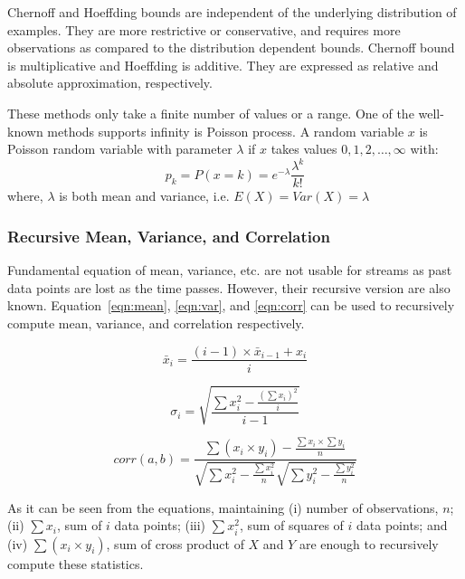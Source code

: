 \documentclass[a4paper, 11pt, oneside]{book}
\begin{document}
Chernoff and Hoeffding bounds are independent of the underlying distribution of examples. They are more restrictive or conservative, and requires more observations as compared to the distribution dependent bounds. Chernoff bound is multiplicative and Hoeffding is additive. They are expressed as relative and absolute approximation, respectively.

These methods only take a finite number of values or a range. One of the well-known methods supports infinity is Poisson process. A random variable $x$ is Poisson random variable with parameter $\lambda$ if $x$ takes values $0,1,2, \dots, \infty$ with:
    \begin{equation}
    \label{eqn:poisson}
        p_k = P(x=k) = e^{-\lambda} \frac{\lambda^k}{k!}
    \end{equation}
    where, $\lambda$ is both mean and variance, i.e. $E(X) = Var(X) = \lambda$
    
\subsubsection{Recursive Mean, Variance, and Correlation}
Fundamental equation of mean, variance, etc. are not usable for streams as past data points are lost as the time passes. However, their recursive version are also known. Equation~\ref{eqn:mean}, \ref{eqn:var}, and \ref{eqn:corr} can be used to recursively compute mean, variance, and correlation respectively.

\begin{equation}
\label{eqn:mean}
    \bar{x}_i = \frac{(i-1) \times \bar{x}_{i-1} + x_i}{i}
\end{equation}

\begin{equation}
\label{eqn:var}
    \sigma_i = \sqrt{ \frac{\sum x_i^2 - \frac{ (\sum x_i )^2}{i} }{i-1} }
\end{equation}

\begin{equation}
\label{eqn:corr}
    corr(a, b) = \frac{ \sum(x_i \times y_i) - \frac{\sum x_i \times \sum y_i}{n} }{\sqrt{\sum x_i^2 - \frac{\sum x_i^2}{n}} \sqrt{\sum y_i^2 - \frac{\sum y_i^2}{n}}}
\end{equation}

As it can be seen from the equations, maintaining (i) number of observations, $n$; (ii) $\sum x_i$, sum of $i$ data points; (iii) $\sum x_i^2$, sum of squares of $i$ data points; and (iv) $\sum (x_i \times y_i)$, sum of cross product of $X$ and $Y$ are enough to recursively compute these statistics.
\end{document}
